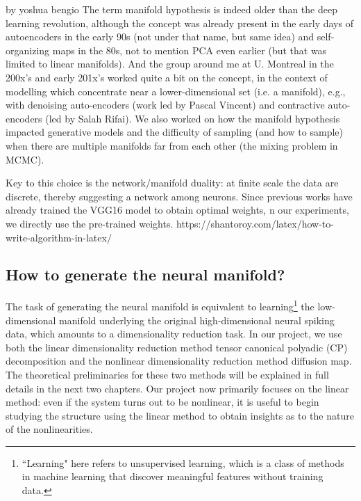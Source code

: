 

by yoshua bengio
The term manifold hypothesis is indeed older than the deep learning revolution, although the concept was already present in the early days of autoencoders in the early 90s (not under that name, but same idea) and self-organizing maps in the 80s, not to mention PCA even earlier (but that was limited to linear manifolds). And the group around me at U. Montreal in the 200x's and early 201x's worked quite a bit on the concept, in the context of modelling which concentrate near a lower-dimensional set (i.e. a manifold), e.g., with denoising auto-encoders (work led by Pascal Vincent) and contractive auto-encoders (led by Salah Rifai). We also worked on how the manifold hypothesis impacted generative models and the difficulty of sampling (and how to sample) when there are multiple manifolds far from each other (the mixing problem in MCMC).


Key to this choice is the network/manifold duality: at finite scale the data are discrete, thereby suggesting a network among neurons.
 Since previous works have already trained the VGG16 model to obtain optimal weights, n our experiments, we directly use the pre-trained weights.
https://shantoroy.com/latex/how-to-write-algorithm-in-latex/
\subsection{How to generate the neural manifold?}
The task of generating the neural manifold is equivalent to learning\footnote{``Learning" here refers to unsupervised learning, which is a class of methods in machine learning that discover meaningful features without training data.} the low-dimensional manifold underlying the original high-dimensional neural spiking data, which amounts to a dimensionality reduction task. In our project, we use both the linear dimensionality reduction method tensor canonical polyadic (CP) decomposition and the nonlinear dimensionality reduction method diffusion map. The theoretical preliminaries for these two methods will be explained in full details in the next two chapters. Our project now primarily focuses on the linear method: even if the system turns out to be nonlinear, it is useful to begin studying the structure using the linear method to obtain insights as to the nature of the nonlinearities.



